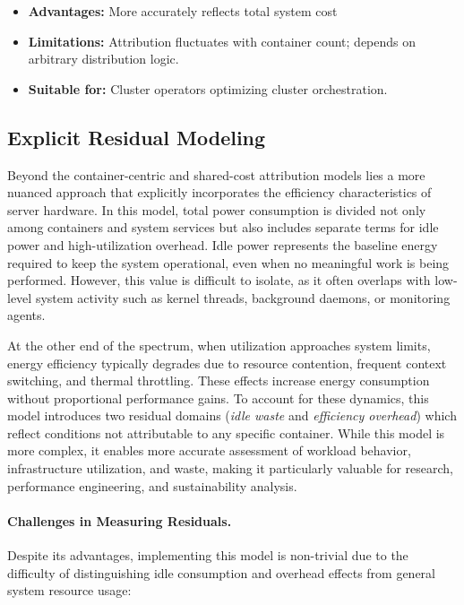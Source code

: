 \begin{itemize}
    \item \textbf{Advantages:} More accurately reflects total system cost
    \item \textbf{Limitations:} Attribution fluctuates with container count; depends on arbitrary distribution logic.
    \item \textbf{Suitable for:} Cluster operators optimizing cluster orchestration.
\end{itemize}

\subsection{Explicit Residual Modeling}
\label{sec:residual-model}

Beyond the container-centric and shared-cost attribution models lies a more nuanced approach that explicitly incorporates the efficiency characteristics of server hardware. In this model, total power consumption is divided not only among containers and system services but also includes separate terms for idle power and high-utilization overhead. Idle power represents the baseline energy required to keep the system operational, even when no meaningful work is being performed. However, this value is difficult to isolate, as it often overlaps with low-level system activity such as kernel threads, background daemons, or monitoring agents.

At the other end of the spectrum, when utilization approaches system limits, energy efficiency typically degrades due to resource contention, frequent context switching, and thermal throttling\parencite{harchol2013performance}. These effects increase energy consumption without proportional performance gains. To account for these dynamics, this model introduces two residual domains (\textit{idle waste} and \textit{efficiency overhead}) which reflect conditions not attributable to any specific container. While this model is more complex, it enables more accurate assessment of workload behavior, infrastructure utilization, and waste, making it particularly valuable for research, performance engineering, and sustainability analysis.

\paragraph{Challenges in Measuring Residuals.} 
Despite its advantages, implementing this model is non-trivial due to the difficulty of distinguishing idle consumption and overhead effects from general system resource usage:

